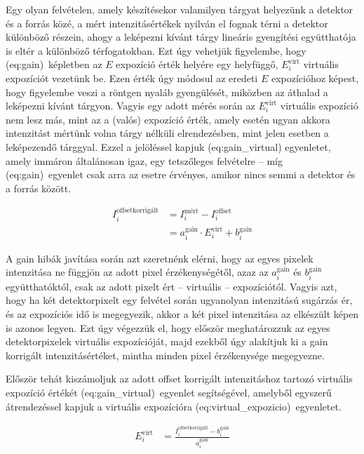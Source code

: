 \documentclass[a4paper,12pt]{article}
\begin{document}
Egy olyan felvételen, amely készítésekor valamilyen tárgyat helyezünk a detektor és a forrás közé, a mért intenzitásértékek nyilván el fognak térni a detektor különböző részein, ahogy a leképezni kívánt tárgy lineáris gyengítési együtthatója is eltér a különböző térfogatokban. Ezt úgy vehetjük figyelembe, hogy  \aref({eq:gain})~képletben az $E$ expozíció érték helyére egy helyfüggő, $E_i^{\text{virt}}$ virtuális expozíciót vezetünk be. Ezen érték úgy módosul az eredeti $E$ expozícióhoz képest, hogy figyelembe veszi a röntgen nyaláb gyengülését, miközben az áthalad a leképezni kívánt tárgyon. Vagyis egy adott mérés során az $E_i^{\text{virt}}$ virtuális expozíció nem lesz más, mint az a (valós) expozíció érték, amely esetén ugyan akkora intenzitást mértünk volna tárgy nélküli elrendezésben, mint jelen esetben a leképezendő tárggyal. Ezzel a jelöléssel kapjuk \aref({eq:gain_virtual}) egyenletet, amely immáron általánosan igaz, egy tetszőleges felvételre -- míg \aref({eq:gain})~egyenlet csak arra az esetre érvényes, amikor nincs semmi a detektor és a forrás között.

\begin{equation}
\label{eq:gain_virtual}
\begin{split}
I_i^{\text{offsetkorrigált}}  &=  I_i^{\text{mért}} - I_i^{\text{offset}} \\&=  a_i^{\text{gain}} \cdot E_i^{\text{virt}} + b_i^{\text{gain}}
\end{split}
\end{equation}


A gain hibák javítása során azt szeretnénk elérni, hogy az egyes pixelek intenzitása ne függjön az adott pixel érzékenységétől, azaz az $a_i^{\text{gain}}  $ és $b_i^{\text{gain}}$  együtthatóktól, csak az adott pixelt ért -- virtuális -- expozíciótól. Vagyis azt, hogy ha két detektorpixelt egy felvétel során ugyanolyan intenzitású sugárzás ér, és az expozíciós idő is megegyezik, akkor a két pixel intenzitása az elkészült képen is azonos legyen. 
Ezt úgy végezzük el, hogy először meghatározzuk az egyes detektorpixelek virtuális expozícióját, majd ezekből úgy alakítjuk ki a gain korrigált intenzitásértéket, mintha minden pixel érzékenysége megegyezne.

Először tehát kiszámoljuk az adott offset korrigált intenzitáshoz tartozó virtuális expozíció értékét \aref({eq:gain_virtual})~egyenlet segítségével, amelyből egyszerű átrendezéssel kapjuk a virtuális expozícióra  \aref({eq:virtual_expozicio})~egyenletet. 

\begin{equation}
\label{eq:virtual_expozicio}
\begin{split}
 E_i^{\text{virt}} &= \frac{I_i^{\text{offsetkorrigált}} -  b_i^{\text{gain}}}{  a_i^{\text{gain}}}
 \end{split}
\end{equation}
\end{document}
